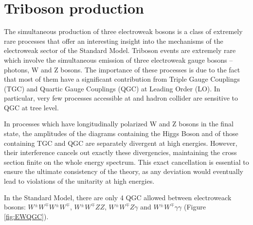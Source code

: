 \section{Triboson production}
The simultaneous production of three electroweak bosons is a class of extremely rare processes that offer an interesting insight into the mechanisms of the electroweak sector of the Standard Model.
Triboson events are extremely rare which involve the simultaneous emission of three electroweak gauge bosons -- photons, W and Z bosons.
The importance of these processes is due to the fact that most of them have a significant contribution from Triple Gauge Couplings (TGC) and Quartic Gauge Couplings (QGC) at Leading Order (LO).
In particular, very few processes accessible at and hadron collider are sensitive to QGC at tree level.

In processes which have longitudinally polarized W and Z bosons in the final state, the amplitudes of the diagrams containing the Higgs Boson and of those containing TGC and QGC are separately divergent at high energies.
However, their interference cancels out exactly these divergencies, maintaining the cross section finite on the whole energy spectrum.
This exact cancellation is essential to ensure the ultimate consistency of the theory, as any deviation would eventually lead to violations of the unitarity at high energies.

In the Standard Model, there are only 4 QGC allowed between electroweack bosons: $W^\pm W^\mp W^\pm W^\mp$, $W^\pm W^\mp Z Z$, $W^\pm W^\mp Z \gamma$ and $W^\pm W^\mp \gamma \gamma$ (Figure \ref{fig:EWQGC}).

